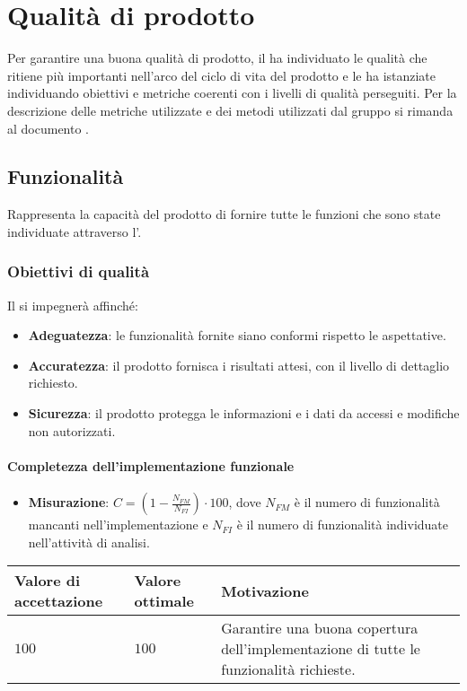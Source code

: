 \newpage
\section{Qualità di prodotto}
Per garantire una buona qualità di prodotto, il  ha individuato le qualità che ritiene più importanti nell'arco del ciclo di vita del prodotto e le ha istanziate individuando obiettivi e metriche coerenti con i livelli di qualità perseguiti. Per la descrizione delle metriche utilizzate e dei metodi utilizzati dal gruppo si rimanda al documento \NdP.

\subsection{Funzionalità}
Rappresenta la capacità del prodotto di fornire tutte le funzioni che sono state individuate attraverso l'\AdR.

\subsubsection{Obiettivi di qualità}
Il  si impegnerà affinché:
\begin{itemize}
\item \textbf{Adeguatezza}: le funzionalità fornite siano conformi rispetto le aspettative.
\item \textbf{Accuratezza}: il prodotto fornisca i risultati attesi, con il livello di dettaglio richiesto.
\item \textbf{Sicurezza}: il prodotto protegga le informazioni e i dati da accessi e modifiche non autorizzati.
\end{itemize}

\paragraph{Completezza dell'implementazione funzionale}
\begin{itemize}
\item \textbf{Misurazione}: $C=(1-\frac{N_{FM}}{N_{FI}}) \cdot 100$, dove $N_{FM}$ è il numero di funzionalità mancanti nell'implementazione e $N_{FI}$ è il numero di funzionalità individuate nell'attività di analisi.
\end{itemize}

\begin{center}

		\begin{tabular}{|P{2.5cm}|P{2.5cm}|P{6cm}|}
		\hline
			\textbf{Valore di accettazione}	& \textbf{Valore ottimale} & \textbf{Motivazione} \\
			\hline
			$100$ & $100$ & Garantire una buona copertura dell'implementazione di tutte le funzionalità richieste. \\
			\hline
			\end{tabular}
\end{center}

